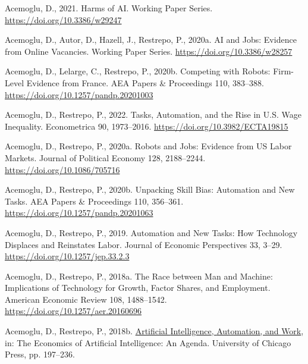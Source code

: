 \documentclass[
  11,
  a4paperpaper,
]{article}
\newlength{\cslhangindent}
\newenvironment{CSLReferences}[2] %
 {\begin{list}{}{%
  \setlength{\itemindent}{0pt}
  \setlength{\leftmargin}{0pt}
  \setlength{\parsep}{0pt}
  \ifodd #1
   \setlength{\leftmargin}{\cslhangindent}
   \setlength{\itemindent}{-1\cslhangindent}
  \fi
  \setlength{\itemsep}{#2\baselineskip}}}
 {\end{list}}
\begin{document}
\label{refs}
\begin{CSLReferences}{1}{0}
Acemoglu, D., 2021. Harms of {AI}. Working {Paper} {Series}.
\url{https://doi.org/10.3386/w29247}

Acemoglu, D., Autor, D., Hazell, J., Restrepo, P., 2020a. {AI} and
{Jobs}: {Evidence} from {Online} {Vacancies}. Working {Paper} {Series}.
\url{https://doi.org/10.3386/w28257}

Acemoglu, D., Lelarge, C., Restrepo, P., 2020b. Competing with {Robots}:
{Firm}-{Level} {Evidence} from {France}. AEA Papers \& Proceedings 110,
383--388. \url{https://doi.org/10.1257/pandp.20201003}

Acemoglu, D., Restrepo, P., 2022. Tasks, {Automation}, and the {Rise} in
{U}.{S}. {Wage} {Inequality}. Econometrica 90, 1973--2016.
\url{https://doi.org/10.3982/ECTA19815}

Acemoglu, D., Restrepo, P., 2020a. Robots and {Jobs}: {Evidence} from
{US} {Labor} {Markets}. Journal of Political Economy 128, 2188--2244.
\url{https://doi.org/10.1086/705716}

Acemoglu, D., Restrepo, P., 2020b. Unpacking {Skill} {Bias}:
{Automation} and {New} {Tasks}. AEA Papers \& Proceedings 110, 356--361.
\url{https://doi.org/10.1257/pandp.20201063}

Acemoglu, D., Restrepo, P., 2019. Automation and {New} {Tasks}: {How}
{Technology} {Displaces} and {Reinstates} {Labor}. Journal of Economic
Perspectives 33, 3--29. \url{https://doi.org/10.1257/jep.33.2.3}

Acemoglu, D., Restrepo, P., 2018a. The {Race} between {Man} and
{Machine}: {Implications} of {Technology} for {Growth}, {Factor}
{Shares}, and {Employment}. American Economic Review 108, 1488--1542.
\url{https://doi.org/10.1257/aer.20160696}

Acemoglu, D., Restrepo, P., 2018b.
\href{https://www.nber.org/books-and-chapters/economics-artificial-intelligence-agenda/artificial-intelligence-automation-and-work}{Artificial
{Intelligence}, {Automation}, and {Work}}, in: The {Economics} of
{Artificial} {Intelligence}: {An} {Agenda}. University of Chicago Press,
pp. 197--236.


\end{CSLReferences}
\end{document}
